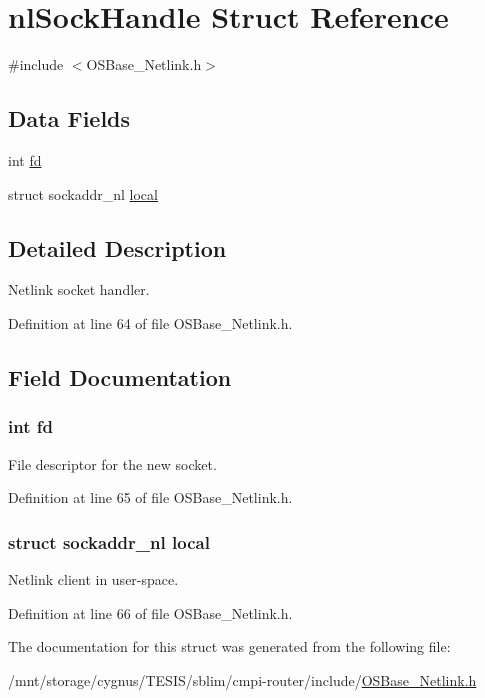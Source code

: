 \hypertarget{structnl_sock_handle}{
\section{nlSockHandle Struct Reference}
\label{structnl_sock_handle}
}


{\ttfamily \#include $<$OSBase\_\-Netlink.h$>$}\subsection*{Data Fields}
\begin{DoxyCompactItemize}
\item 
int \hyperlink{structnl_sock_handle_a6f8059414f0228f0256115e024eeed4b}{fd}
\item 
struct sockaddr\_\-nl \hyperlink{structnl_sock_handle_a8405f4654d2f123881c0cafece907339}{local}
\end{DoxyCompactItemize}


\subsection{Detailed Description}
Netlink socket handler. 

Definition at line 64 of file OSBase\_\-Netlink.h.

\subsection{Field Documentation}
\hypertarget{structnl_sock_handle_a6f8059414f0228f0256115e024eeed4b}{
\subsubsection[{fd}]{\setlength{\rightskip}{0pt plus 5cm}int {\bf fd}}}
\label{structnl_sock_handle_a6f8059414f0228f0256115e024eeed4b}
File descriptor for the new socket. 

Definition at line 65 of file OSBase\_\-Netlink.h.\hypertarget{structnl_sock_handle_a8405f4654d2f123881c0cafece907339}{
\subsubsection[{local}]{\setlength{\rightskip}{0pt plus 5cm}struct sockaddr\_\-nl {\bf local}}}
\label{structnl_sock_handle_a8405f4654d2f123881c0cafece907339}
Netlink client in user-\/space. 

Definition at line 66 of file OSBase\_\-Netlink.h.

The documentation for this struct was generated from the following file:\begin{DoxyCompactItemize}
\item 
/mnt/storage/cygnus/TESIS/sblim/cmpi-\/router/include/\hyperlink{_o_s_base___netlink_8h}{OSBase\_\-Netlink.h}\end{DoxyCompactItemize}
